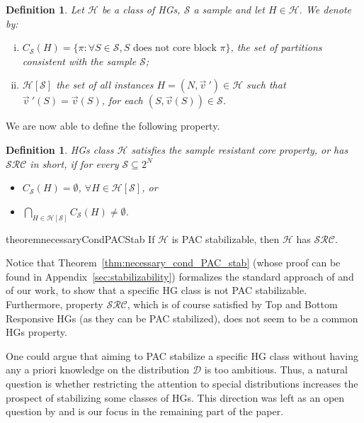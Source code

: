 \documentclass[letterpaper]{article} %
\newtheorem{definition}[theorem]{Definition}
\newcommand{\distribution}{\mathcal{D}}
\newcommand{\set}[1]{\{#1\}}
\newcommand{\hclass}{\ensuremath{\mathcal{H}}}
\newcommand{\sample}{\ensuremath{\mathcal{S}}}
\begin{document}
\begin{definition}
Let $\mathcal{H}$ be a class of HGs, $\sample$ a sample and let $H \in \hclass$. We denote by:
\begin{enumerate}[(i)]
    \item $C_\sample(H)= \set{\pi : \forall S\in \sample, S \text{ does not core block } \pi}$, the set of partitions consistent with the sample $\sample$;
    \item $\hclass[\mathcal{S}]$ the set of all instances $H=(N, \vec{v}\ ')\in\hclass$ such that $\vec{v}\ '(S)= \vec{v}(S)$, for each $(S, \vec{v}(S))\in\sample$.
\end{enumerate}
\end{definition}
We are now able to define the following property.
\begin{definition}
HGs class $\hclass$ satisfies the {\em sample resistant core} property, or has $\mathcal{SRC}$ in short, if for every $ \mathcal{S}\subseteq 2^N$ 
\begin{itemize}
    \item $C_\mathcal{S}(H)=\emptyset $, $\forall H \in \mathcal{H}[\mathcal{S}]$, or
    \item $\bigcap_{H \in \mathcal{H}[\mathcal{S}]} C_\mathcal{S}(H) \neq \emptyset$.
\end{itemize}
\end{definition}
\begin{restatable}{theorem}{necessaryCondPACStab}\label{thm:necessary_cond_PAC_stab}
If $\mathcal{H}$ is PAC stabilizable, then $\mathcal{H}$ has $\mathcal{SRC}$.
\end{restatable}
Notice that Theorem~\ref{thm:necessary_cond_PAC_stab} (whose proof can be found in Appendix~\ref{sec:stabilizability}) formalizes the standard approach of \citet{SliwinskiZ17} and of our work, to show that a specific HG class is not PAC stabilizable. Furthermore, property $\mathcal{SRC}$, which is of course satisfied by Top and Bottom Responsive HGs (as they can be PAC stabilized), does not seem to be a common HGs property.

One could argue that aiming to PAC stabilize a specific HG class without having any a priori knowledge on the distribution $\distribution$ is too ambitious. Thus, a natural question is whether restricting the attention to special distributions increases the prospect of stabilizing some classes of HGs. This direction was left as an open question by \citet{SliwinskiZ17} and is our focus in the remaining part of the paper. 
\end{document}
